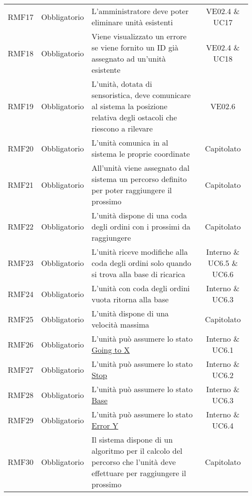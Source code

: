 \begin{longtable}[h!] { c c m{8cm} c}
		RMF17& Obbligatorio & L'amministratore deve poter eliminare unità esistenti & VE02.4 \& UC17 \\

		RMF18 & Obbligatorio & Viene visualizzato un errore se viene fornito un ID già assegnato ad un'unità esistente & VE02.4 \& UC18 \\

		RMF19 & Obbligatorio & L'unità, dotata di sensoristica, deve comunicare al sistema la posizione relativa degli ostacoli che riescono a rilevare & VE02.6 \\

		RMF20 & Obbligatorio & L'unità comunica in \glock{real-time} al sistema le proprie coordinate & Capitolato \\

		RMF21 & Obbligatorio & All'unità viene assegnato dal sistema un percorso definito per poter raggiungere il prossimo \glock{POI} & Capitolato \\

		RMF22 & Obbligatorio & L'unità dispone di una coda degli ordini con i prossimi \glock{POI} da raggiungere & Capitolato \\

		RMF23 & Obbligatorio & L'unità riceve modifiche alla coda degli ordini solo quando si trova alla base di ricarica & Interno \& UC6.5 \& UC6.6 \\

		RMF24 & Obbligatorio & L'unità con coda degli ordini vuota ritorna alla base & Interno \& UC6.3 \\

		RMF25 & Obbligatorio & L'unità dispone di una velocità massima & Capitolato \\

		RMF26 & Obbligatorio & L'unità può assumere lo stato \underline{Going to X} & Interno \& UC6.1 \\

		RMF27 & Obbligatorio & L'unità può assumere lo stato \underline{Stop} & Interno \& UC6.2 \\

		RMF28 & Obbligatorio & L'unità può assumere lo stato \underline{Base} & Interno \& UC6.3 \\

		RMF29 & Obbligatorio & L'unità può assumere lo stato \underline{Error Y} & Interno \& UC6.4 \\

		RMF30 & Obbligatorio & Il sistema dispone di un algoritmo per il calcolo del percorso che l'unità deve effettuare per raggiungere il prossimo \glock{POI} & Capitolato \\


\end{longtable}
